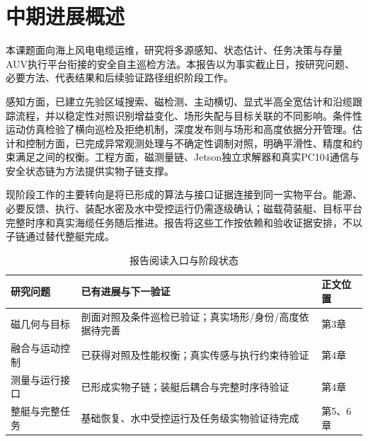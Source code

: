 \chapter*{中期进展概述}

本课题面向海上风电电缆运维，研究将多源感知、状态估计、任务决策与存量AUV执行平台衔接的安全自主巡检方法。本报告以\ReportCutoff 为事实截止日，按研究问题、必要方法、代表结果和后续验证路径组织阶段工作。

感知方面，已建立先验区域搜索、磁检测、主动横切、显式半高全宽估计和沿缆跟踪流程，并以稳定性对照识别增益变化、场形失配与目标关联的不同影响。条件性运动仿真检验了横向巡检及拒绝机制，深度发布则与场形和高度依据分开管理。估计和控制方面，已完成异常观测处理与不确定性调制对照，明确平滑性、精度和约束满足之间的权衡。工程方面，磁测量链、Jetson独立求解器和真实PC104通信与安全状态链为方法提供实物子链支撑。

现阶段工作的主要转向是将已形成的算法与接口证据连接到同一实物平台。能源、必要反馈、执行、装配水密及水中受控运行仍需逐级确认；磁载荷装艇、目标平台完整时序和真实海缆任务随后推进。报告将这些工作按依赖和验收证据安排，不以子链通过替代整艇完成。

\begin{table}[htbp]
\centering\caption{报告阅读入口与阶段状态}
\begin{tabularx}{\linewidth}{p{2.5cm}Xp{2.2cm}}\toprule
研究问题&已有进展与下一验证&正文位置\\\midrule
磁几何与目标&剖面对照及条件巡检已验证；真实场形/身份/高度依据待完善&第3章\\
融合与运动控制&已获得对照及性能权衡；真实传感与执行约束待验证&第4章\\
测量与运行接口&已形成实物子链；装艇后耦合与完整时序待验证&第4章\\
整艇与完整任务&基础恢复、水中受控运行及任务级实物验证待完成&第5、6章\\\bottomrule
\end{tabularx}
\end{table}
